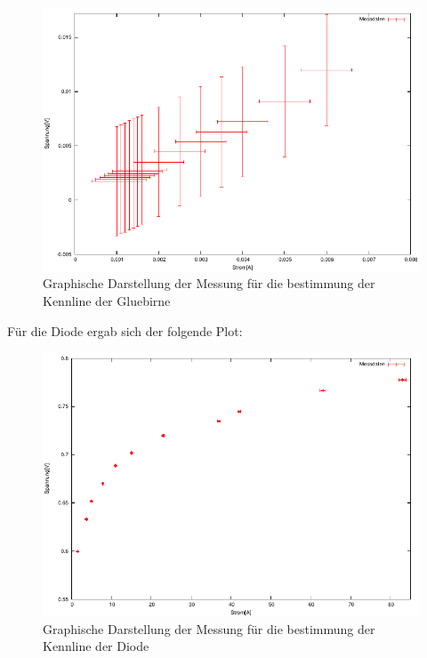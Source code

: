 \documentclass[12pt]{scrartcl}
\begin{document}
\begin{figure}[htbp] 
	 \centering
	   \includegraphics[scale = 1]{Gluebirne.pdf}
	 	\caption[Graphische Darstellung der Messung für die bestimmung der Kennline der Gluebirne]{Graphische Darstellung der Messung für die bestimmung der Kennline der Gluebirne}
	 \label{fig:aufgabe_6_a_plot}
\end{figure}

Für die Diode ergab sich der folgende Plot:

\begin{figure}[htbp] 
	 \centering
	   \includegraphics[scale = 1]{Diode.pdf}
	 	\caption[Graphische Darstellung der Messung für die bestimmung der Kennline der Diode]{Graphische Darstellung der Messung für die bestimmung der Kennline der Diode}
	 \label{fig:aufgabe_6_a_plot}
\end{figure}
\end{document}
